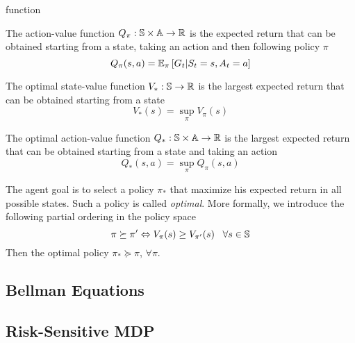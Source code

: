 function 
\begin{definition}
	The action-value function $Q_\pi: \S \times \A \to \R$ is the expected 
	return that can be obtained starting from a state, taking an action and
	then following policy $\pi$
	\begin{equation}
		Q_\pi(s,a) = \E[\pi]{G_t|S_t = s, A_t = a}
	\end{equation}
\end{definition}
\begin{definition}
	The optimal state-value function $V_*: \S \to \R$ is the largest expected 
	return that can be obtained starting from a state
	\begin{equation}
		V_*(s) = \sup_\pi V_\pi(s)
	\end{equation}
\end{definition}
\begin{definition}
	The optimal action-value function $Q_*: \S \times \A \to \R$ is the largest
	expected return that can be obtained starting from a state and taking an
	action
	\begin{equation}
		Q_*(s,a) = \sup_\pi Q_\pi(s,a)
	\end{equation}
\end{definition}
The agent goal is to select a policy $\pi_*$ that maximize his expected return
in all possible states. Such a policy is called \emph{optimal}. More formally,
we introduce the following partial ordering in the policy space
\begin{equation}
	\pi \succeq \pi' \Leftrightarrow V_\pi(s) \geq V_{\pi'}(s) \;\;\; \forall s \in \S
\end{equation}
Then the optimal policy $\pi_* \succeq \pi$, $\forall \pi$.

\subsection{Bellman Equations}

\subsection{Risk-Sensitive MDP}

